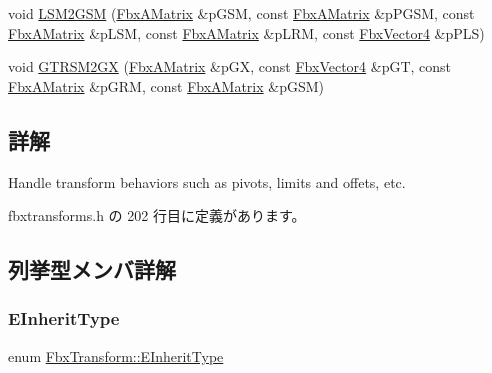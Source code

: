 \begin{DoxyCompactItemize}
\item 
void \hyperlink{class_fbx_transform_a152f85edfff375ffe59e27cbbd41c137}{L\+S\+M2\+G\+SM} (\hyperlink{class_fbx_a_matrix}{Fbx\+A\+Matrix} \&p\+G\+SM, const \hyperlink{class_fbx_a_matrix}{Fbx\+A\+Matrix} \&p\+P\+G\+SM, const \hyperlink{class_fbx_a_matrix}{Fbx\+A\+Matrix} \&p\+L\+SM, const \hyperlink{class_fbx_a_matrix}{Fbx\+A\+Matrix} \&p\+L\+RM, const \hyperlink{class_fbx_vector4}{Fbx\+Vector4} \&p\+P\+LS)
\item 
void \hyperlink{class_fbx_transform_a14282735e64e69f9cf4f6e14fa36b841}{G\+T\+R\+S\+M2\+GX} (\hyperlink{class_fbx_a_matrix}{Fbx\+A\+Matrix} \&p\+GX, const \hyperlink{class_fbx_vector4}{Fbx\+Vector4} \&p\+GT, const \hyperlink{class_fbx_a_matrix}{Fbx\+A\+Matrix} \&p\+G\+RM, const \hyperlink{class_fbx_a_matrix}{Fbx\+A\+Matrix} \&p\+G\+SM)
\end{DoxyCompactItemize}


\subsection{詳解}
Handle transform behaviors such as pivots, limits and offets, etc. 

 fbxtransforms.\+h の 202 行目に定義があります。



\subsection{列挙型メンバ詳解}
\mbox{\label{class_fbx_transform_ac1ab8f75b4873723daa68c57f999b10f}} 
\subsubsection{\texorpdfstring{E\+Inherit\+Type}{EInheritType}}
{\footnotesize\ttfamily enum \hyperlink{class_fbx_transform_ac1ab8f75b4873723daa68c57f999b10f}{Fbx\+Transform\+::\+E\+Inherit\+Type}}

